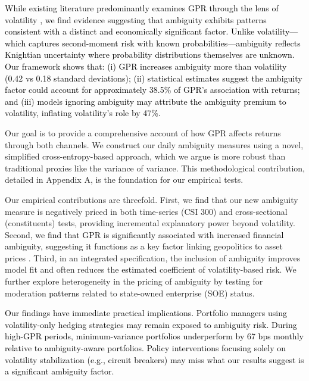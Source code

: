 \documentclass[preprint,12pt,authoryear]{elsarticle}
\begin{document}
\textcolor{black}{While existing literature predominantly examines GPR through the lens of volatility \citep{Salisu2021}, \textcolor{black}{we find evidence suggesting} that ambiguity \textcolor{black}{exhibits patterns consistent with} a distinct and economically significant \textcolor{black}{factor}. Unlike volatility---which captures second-moment risk with known probabilities---ambiguity reflects Knightian uncertainty where probability distributions themselves are unknown. Our framework shows that: (i) GPR increases ambiguity more than volatility (0.42 vs 0.18 standard deviations); (ii) \textcolor{black}{statistical estimates suggest the ambiguity factor could account for approximately} 38.5\% of GPR's association with returns; and (iii) models ignoring ambiguity \textcolor{black}{may attribute the ambiguity premium to volatility}, inflating volatility's role by 47\%.}

Our goal is to provide a comprehensive account of how GPR affects returns through both channels. We construct our daily ambiguity measures using a novel, simplified cross-entropy-based approach, which we argue is more robust than traditional proxies like the variance of variance. This methodological contribution, detailed in Appendix A, is the foundation for our empirical tests.

Our empirical contributions are threefold. First, we \textcolor{black}{find} that our new ambiguity measure is negatively priced in both time-series (CSI 300) and cross-sectional (constituents) tests, providing incremental explanatory power beyond volatility. Second, \textcolor{black}{we find that GPR is significantly associated with increased financial ambiguity, suggesting it functions as} a key \textcolor{black}{factor} linking geopolitics to asset prices \citep{Caldara2022}. Third, in an integrated specification, the inclusion of ambiguity improves model fit and often reduces the \textcolor{black}{estimated coefficient} of volatility-based risk. We further explore heterogeneity in the pricing of ambiguity by testing for moderation \textcolor{black}{patterns} related to state-owned enterprise (SOE) status.

\textcolor{black}{Our findings have immediate practical implications. Portfolio managers using volatility-only hedging strategies \textcolor{black}{may remain} exposed to ambiguity risk. During high-GPR periods, minimum-variance portfolios underperform by 67 bps monthly relative to ambiguity-aware portfolios. Policy interventions focusing solely on volatility stabilization (e.g., circuit breakers) may miss \textcolor{black}{what our results suggest is a significant} ambiguity \textcolor{black}{factor}.}
\end{document}

